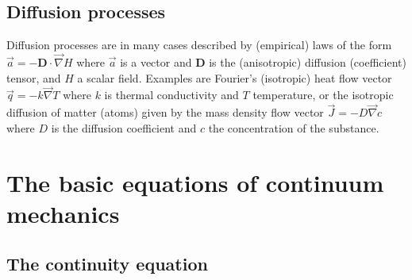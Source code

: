 \vspace{0.5cm}
\vspace{0.5cm}

\subsection{Diffusion processes} 

Diffusion processes are in many cases described by (empirical) 
laws of the form $\vec{a} = -{\bm D} \cdot \vec\nabla H$
where $\vec{a}$ is a vector and ${\bm D}$ 
is the (anisotropic) diffusion (coefficient) tensor,
and $H$ a scalar field. 
Examples are Fourier’s (isotropic) heat flow vector 
$\vec{q} = -k \vec\nabla T$
where $k$ is thermal conductivity and $T$ temperature, 
or the isotropic diffusion of matter
(atoms) given by the mass density flow vector $\vec{J} = -D \vec\nabla c$
where $D$ is the diffusion
coefficient and $c$ the concentration of the substance.


\section{The basic equations of continuum mechanics}

\subsection{The continuity equation} 

